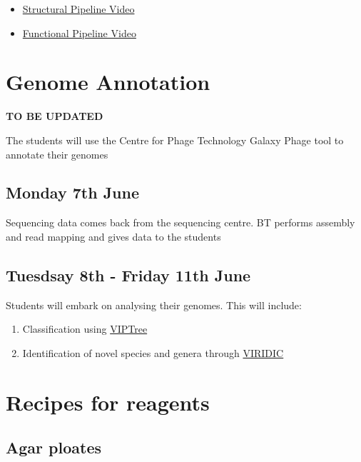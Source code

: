 \documentclass[
]{book}
\providecommand{\tightlist}{%
  \setlength{\itemsep}{0pt}\setlength{\parskip}{0pt}}
\begin{document}
\begin{itemize}
\tightlist
\item
  \href{https://t.co/F9Gv0rCHhS}{Structural Pipeline Video}
\item
  \href{https://t.co/5veyKIswWv}{Functional Pipeline Video}
\end{itemize}

\hypertarget{genome-annotation}{%
\chapter{Genome Annotation}\label{genome-annotation}}

\textbf{TO BE UPDATED}

The students will use the Centre for Phage Technology Galaxy Phage tool to annotate their genomes

\hypertarget{monday-7th-june}{%
\section{Monday 7th June}\label{monday-7th-june}}

Sequencing data comes back from the sequencing centre. BT performs assembly and read mapping and gives data to the students

\hypertarget{tuesdsay-8th---friday-11th-june}{%
\section{Tuesdsay 8th - Friday 11th June}\label{tuesdsay-8th---friday-11th-june}}

Students will embark on analysing their genomes. This will include:

\begin{enumerate}
\def\labelenumi{\arabic{enumi}.}
\tightlist
\item
  Classification using \href{https://www.genome.jp/viptree/}{VIPTree}
\item
  Identification of novel species and genera through \href{http://rhea.icbm.uni-oldenburg.de/VIRIDIC/}{VIRIDIC}
\end{enumerate}

\hypertarget{recipes-for-reagents}{%
\chapter*{Recipes for reagents}\label{recipes-for-reagents}}

\hypertarget{agar-ploates}{%
\section{Agar ploates}\label{agar-ploates}}
\end{document}
